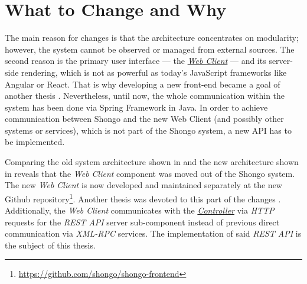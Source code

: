 \section{What to Change and Why}

The main reason for changes is that the architecture concentrates on modularity; however, the system cannot be observed or managed from external sources.
The second reason is the primary user interface --- the \hyperref[webclient]{\emph{Web Client}} --- and its server-side rendering, which is not as powerful as today's JavaScript frameworks like Angular or React.
That is why developing a new front-end became a goal of another thesis \cite{drobnakm}.
Nevertheless, until now, the whole communication within the system has been done via Spring Framework in Java. In order to achieve communication between Shongo and the new Web Client (and possibly other systems or services), which is not part of the Shongo system, a new API has to be implemented.


Comparing the old system architecture shown in  and the new architecture shown in  reveals that the \emph{Web Client} component was moved out of the Shongo system. The new \emph{Web Client} is now developed and maintained separately at the new Github repository\footnote{\url{https://github.com/shongo/shongo-frontend}}. Another thesis was devoted to this part of the changes \cite{drobnakm}.
Additionally, the \emph{Web Client} communicates with the \hyperref[controller]{\emph{Controller}} via \emph{HTTP} requests for the \emph{REST API} server sub-component instead of previous direct communication via \emph{XML-RPC} services. The implementation of said \emph{REST API} is the subject of this thesis.

